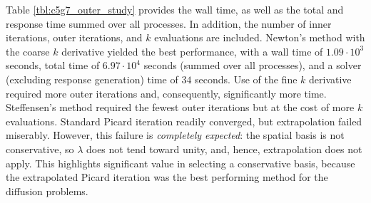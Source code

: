 Table \ref{tbl:c5g7_outer_study} provides the wall time,
as well as the total and response time summed over all 
processes.  In addition, the number of inner iterations,
outer iterations, and $k$ evaluations are included. Newton's method with the 
coarse $k$ derivative yielded the best performance, with a wall 
time of $1.09\cdot 10^3$ seconds, total 
time of $6.97\cdot 10^4$ seconds (summed over 
all processes), and a solver (excluding response generation) time of 
$34$ seconds. Use of 
the fine $k$ derivative required more outer iterations and, consequently, 
significantly more time.  Steffensen's method required the 
fewest outer iterations but at the 
cost of more $k$ evaluations.  Standard Picard iteration 
readily converged, but extrapolation
failed miserably.  However, this failure is {\it completely expected}: 
the spatial basis is not conservative, so $\lambda$ does not 
tend toward unity, and, hence, extrapolation does not apply.  This 
highlights significant value in selecting a conservative basis, 
because the extrapolated Picard iteration was the best performing 
method for the diffusion problems.


